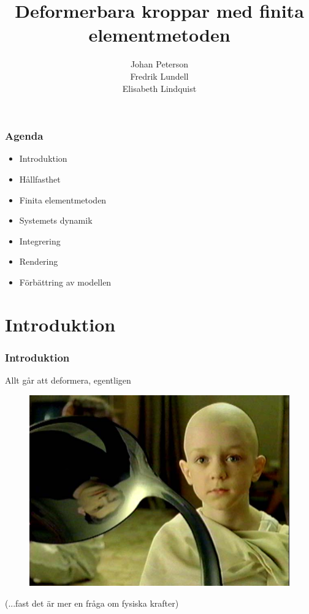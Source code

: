 \documentclass{beamer}
\title{Deformerbara kroppar med finita elementmetoden}
\author{Johan Peterson\\Fredrik Lundell\\Elisabeth Lindquist}
\begin{document}
\begin{frame}
\maketitle
\end{frame}

\begin{frame}
\frametitle{Agenda}
\begin{itemize}
\item Introduktion
\item Hållfasthet
\item Finita elementmetoden
\item Systemets dynamik
\item Integrering
\item Rendering
\item Förbättring av modellen
\end{itemize}

\end{frame}

\section{Introduktion}
\begin{frame}
\frametitle{Introduktion}
\begin{block}{Allt går att deformera, egentligen}
\begin{figure}
\includegraphics[scale=0.05]{photo_movieMatrix-quoteSpoon.png} 
\end{figure}
\begin{tiny}
(...fast det är mer en fråga om fysiska krafter)
\end{tiny}
\end{block}
\end{frame}
\end{document}
